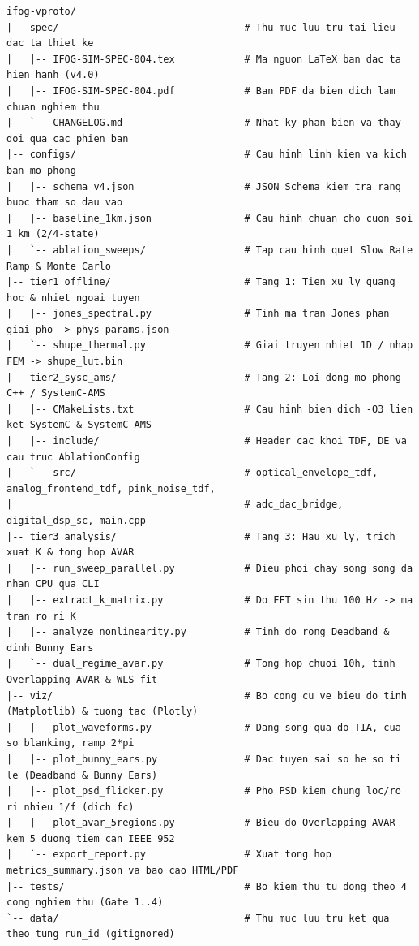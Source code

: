 \documentclass[11pt, a4paper]{article}
\begin{document}
\begin{footnotesize}
\begin{verbatim}
ifog-vproto/
|-- spec/                                # Thu muc luu tru tai lieu dac ta thiet ke
|   |-- IFOG-SIM-SPEC-004.tex            # Ma nguon LaTeX ban dac ta hien hanh (v4.0)
|   |-- IFOG-SIM-SPEC-004.pdf            # Ban PDF da bien dich lam chuan nghiem thu
|   `-- CHANGELOG.md                     # Nhat ky phan bien va thay doi qua cac phien ban
|-- configs/                             # Cau hinh linh kien va kich ban mo phong
|   |-- schema_v4.json                   # JSON Schema kiem tra rang buoc tham so dau vao
|   |-- baseline_1km.json                # Cau hinh chuan cho cuon soi 1 km (2/4-state)
|   `-- ablation_sweeps/                 # Tap cau hinh quet Slow Rate Ramp & Monte Carlo
|-- tier1_offline/                       # Tang 1: Tien xu ly quang hoc & nhiet ngoai tuyen
|   |-- jones_spectral.py                # Tinh ma tran Jones phan giai pho -> phys_params.json
|   `-- shupe_thermal.py                 # Giai truyen nhiet 1D / nhap FEM -> shupe_lut.bin
|-- tier2_sysc_ams/                      # Tang 2: Loi dong mo phong C++ / SystemC-AMS
|   |-- CMakeLists.txt                   # Cau hinh bien dich -O3 lien ket SystemC & SystemC-AMS
|   |-- include/                         # Header cac khoi TDF, DE va cau truc AblationConfig
|   `-- src/                             # optical_envelope_tdf, analog_frontend_tdf, pink_noise_tdf,
|                                        # adc_dac_bridge, digital_dsp_sc, main.cpp
|-- tier3_analysis/                      # Tang 3: Hau xu ly, trich xuat K & tong hop AVAR
|   |-- run_sweep_parallel.py            # Dieu phoi chay song song da nhan CPU qua CLI
|   |-- extract_k_matrix.py              # Do FFT sin thu 100 Hz -> ma tran ro ri K
|   |-- analyze_nonlinearity.py          # Tinh do rong Deadband & dinh Bunny Ears
|   `-- dual_regime_avar.py              # Tong hop chuoi 10h, tinh Overlapping AVAR & WLS fit
|-- viz/                                 # Bo cong cu ve bieu do tinh (Matplotlib) & tuong tac (Plotly)
|   |-- plot_waveforms.py                # Dang song qua do TIA, cua so blanking, ramp 2*pi
|   |-- plot_bunny_ears.py               # Dac tuyen sai so he so ti le (Deadband & Bunny Ears)
|   |-- plot_psd_flicker.py              # Pho PSD kiem chung loc/ro ri nhieu 1/f (dich fc)
|   |-- plot_avar_5regions.py            # Bieu do Overlapping AVAR kem 5 duong tiem can IEEE 952
|   `-- export_report.py                 # Xuat tong hop metrics_summary.json va bao cao HTML/PDF
|-- tests/                               # Bo kiem thu tu dong theo 4 cong nghiem thu (Gate 1..4)
`-- data/                                # Thu muc luu tru ket qua theo tung run_id (gitignored)
\end{verbatim}
\end{footnotesize}
\end{document}
